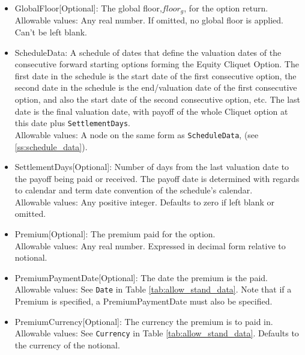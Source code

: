 \begin{itemize}
	\item GlobalFloor[Optional]: The global floor,$floor_{g}$, for the option return. \\
	Allowable values: Any real number. If omitted, no global floor is applied.  Can't be left blank.
	\item ScheduleData: A schedule of dates that define the valuation dates of the consecutive forward starting options forming the Equity Cliquet Option. The first date in the schedule is the start date of the first consecutive option, the second date in the schedule is the end/valuation date of the first consecutive option, and also the start date of the second consecutive option, etc.  The last date is the final valuation date, with payoff of the whole Cliquet option at this date plus \lstinline!SettlementDays!. \\
	 Allowable values: A node on the same form as \lstinline!ScheduleData!, (see \ref{ss:schedule_data}). 
	\item SettlementDays[Optional]: Number of days from the last valuation date to the payoff being paid or received. The payoff date is determined with regards to calendar and
		   term date convention of the schedule's calendar. \\
	Allowable values: Any positive integer. Defaults to zero if left blank or omitted.
	\item Premium[Optional]: The premium paid for the option. \\
	Allowable values: Any real number. Expressed in decimal form relative to notional.
	\item PremiumPaymentDate[Optional]: The date the premium is the paid. \\
	Allowable values: See \lstinline!Date! in Table \ref{tab:allow_stand_data}. Note that if a Premium is specified, a PremiumPaymentDate must also be specified. 
	\item PremiumCurrency[Optional]: The currency the premium is to paid in. \\
	Allowable values: See \lstinline!Currency! in Table \ref{tab:allow_stand_data}. Defaults to the currency of the notional. 
\end{itemize}
